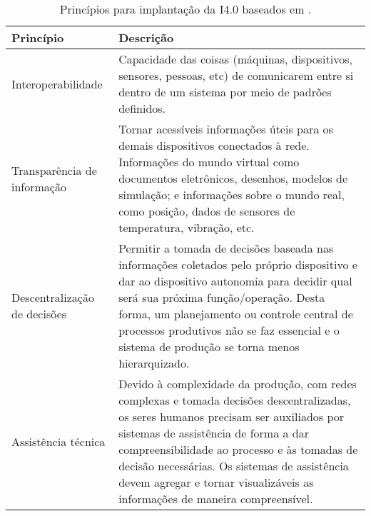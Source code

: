 \begin{table}[htb]
	\centering
	\footnotesize
	\caption{Princípios para implantação da I4.0 baseados em .}
	\begin{tabular}{p{3cm}p{12cm}}
		\hline
		\textbf{Princípio}           & \textbf{Descrição}                                                                                                                                                                                                                                                                                                           \\

		\hline
		Interoperabilidade           &
		Capacidade das coisas (máquinas, dispositivos, sensores, pessoas, etc) de comunicarem entre si dentro de um sistema por meio de padrões definidos.                                                                                                                                                                                                          \\

		\hline
		Transparência de informação  &
		Tornar acessíveis informações úteis para os demais dispositivos conectados à rede. Informações do mundo virtual como documentos eletrônicos, desenhos, modelos de simulação; e informações sobre o mundo real, como posição, dados de sensores de temperatura, vibração, etc.                                                                               \\

		\hline
		Descentralização de decisões &
		Permitir a tomada de decisões baseada nas informações coletados pelo próprio dispositivo e dar ao dispositivo autonomia para decidir qual será sua próxima função/operação. Desta forma, um planejamento ou controle central de processos produtivos não se faz essencial e o sistema de produção se torna menos hierarquizado.                             \\

		\hline
		Assistência técnica          &
		Devido à complexidade da produção, com redes complexas e tomada decisões descentralizadas, os seres humanos precisam ser auxiliados por sistemas de assistência de forma a dar compreensibilidade ao processo e às tomadas de decisão necessárias. Os sistemas de assistência devem agregar e tornar visualizáveis as informações de maneira compreensível. \\

		\hline
	\end{tabular}
	\label{tab:principios-i4}
\end{table}

